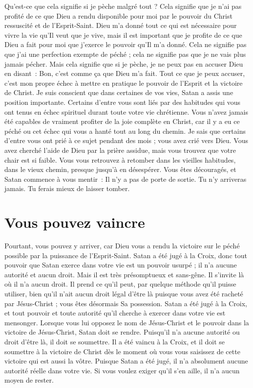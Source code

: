 Qu'est-ce que cela signifie si je pèche malgré tout ?
 Cela signifie que je n'ai pas profité de ce que Dieu a rendu disponible
 pour moi par le pouvoir du Christ ressuscité et de l'Esprit-Saint.
 Dieu m'a donné tout ce qui est nécessaire pour vivre la vie
 qu'Il veut que je vive, mais il est important que je profite
 de ce que Dieu a fait pour moi \ocadr que j'exerce le pouvoir
 qu'Il m'a donné.
 Cela ne signifie pas que j'ai une perfection exempte de péché ;
 cela ne signifie pas que je ne vais plus jamais pécher.
 Mais cela signifie que si je pèche, je ne peux pas en accuser Dieu
 en disant~:
 \og Bon, c'est comme ça que Dieu m'a fait. \fg{}
 Tout ce que je peux accuser, c'est mon propre échec à mettre en pratique
 le pouvoir de l'Esprit et la victoire de Christ.
 Je suis conscient que dans certaines de vos vies,
 Satan a assis une position importante.
 Certains d'entre vous sont liés par des habitudes qui vous ont tenus
 en échec spirituel durant toute votre vie chrétienne.
 Vous n'avez jamais été capables de vraiment profiter de la joie complète
 en Christ, car il y a eu ce péché ou cet échec qui vous a hanté
 tout au long du chemin. Je sais que certains d'entre vous ont prié
 à ce sujet pendant des mois ; vous avez crié vers Dieu.
 Vous avez cherché l'aide de Dieu par la prière assidue,
 mais vous trouvez que votre chair est si faible.
 Vous vous retrouvez à retomber dans les vieilles habitudes,
 dans le vieux chemin, presque jusqu'à en désespérer.
 Vous êtes découragés, et Satan commence à vous mentir~:
 \og Il n'y a pas de porte de sortie. Tu n'y arriveras jamais.
 Tu ferais mieux de laisser tomber. \fg{}


\section*{Vous pouvez vaincre}

Pourtant, vous pouvez y arriver, car Dieu vous a rendu la victoire
 sur le péché possible par la puissance de l'Esprit-Saint.
 Satan a été jugé à la Croix, donc tout pouvoir que Satan exerce
 dans votre vie est un pouvoir usurpé ; il n'a aucune autorité et aucun droit.
 Mais il est très présomptueux et sans-gêne. Il s'invite là où il n'a aucun
 droit. Il prend ce qu'il peut, par quelque méthode qu'il puisse utiliser,
 bien qu'il n'ait aucun droit légal d'être là puisque vous avez été racheté
 par Jésus-Christ ; vous êtes désormais Sa possession.
 Satan a été jugé à la Croix, et tout pouvoir et toute autorité qu'il cherche
 à exercer dans votre vie est mensonger.
 Lorsque vous lui opposez le nom de Jésus-Christ et le pouvoir
 dans la victoire de Jésus-Christ, Satan doit se rendre.
 Puisqu'il n'a aucune autorité ou droit d'être là, il doit se soumettre.
 Il a été vaincu à la Croix, et il doit se soumettre à la victoire de Christ
 dès le moment où vous vous saisissez de cette victoire qui est aussi la vôtre.
 Puisque Satan a été jugé, il n'a absolument aucune autorité réelle
 dans votre vie. Si vous voulez exiger qu'il s'en aille,
 il n'a aucun moyen de rester.


